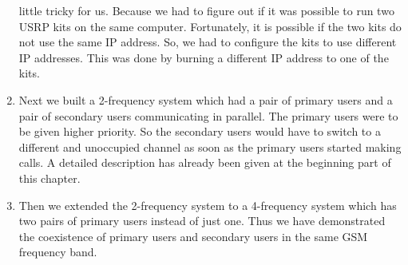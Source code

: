 \begin{enumerate}
    little tricky for us. Because we had to figure out if it was possible to
    run two USRP kits on the same computer. Fortunately, it is possible if the
    two kits do not use the same IP address. So, we had to configure the kits
    to use different IP addresses. This was done by burning a different IP 
    address to one of the kits.
    \item Next we built a 2-frequency system which had a pair of primary 
    users and a pair of secondary users communicating in parallel. The primary
    users were to be given higher priority. So the secondary users would have
    to switch to a different and unoccupied channel as soon as the primary 
    users started making calls. A detailed description has already been given
    at the beginning part of this chapter.
    \item Then we extended the 2-frequency system to a 4-frequency system
    which has two pairs of primary users instead of just one. Thus we have 
    demonstrated the coexistence of primary users and secondary users in the 
    same GSM frequency band.
\end{enumerate}



